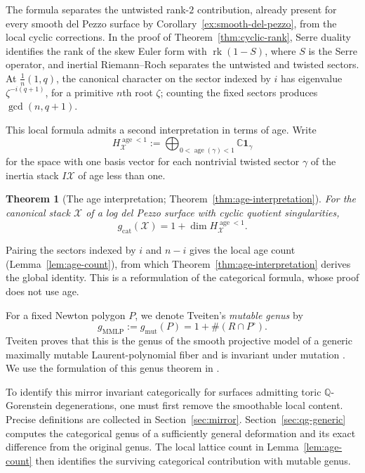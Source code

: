 \documentclass[11pt]{article}
\theoremstyle{plain}
\newtheorem{theorem}{Theorem}[section]
\theoremstyle{definition}
\theoremstyle{remark}
\newcommand{\cX}{\mathcal X}
\newcommand{\rk}{\operatorname{rk}}
\newcommand{\C}{\mathbb C}
\newcommand{\Q}{\mathbb Q}
\newcommand{\1}{\mathbf 1}
\begin{document}
The formula separates the untwisted rank-$2$ contribution, already present for every smooth del Pezzo surface by Corollary~\ref{ex:smooth-del-pezzo}, from the local cyclic corrections.  In the proof of Theorem~\ref{thm:cyclic-rank}, Serre duality identifies the rank of the skew Euler form with $\rk(1-S)$, where $S$ is the Serre operator, and inertial Riemann--Roch separates the untwisted and twisted sectors.  At $\frac1n(1,q)$, the canonical character on the sector indexed by $i$ has eigenvalue $\zeta^{-i(q+1)}$, for a primitive $n$th root $\zeta$; counting the fixed sectors produces $\gcd(n,q+1)$.

This local formula admits a second interpretation in terms of age.  Write
\[
H^{\operatorname{age}<1}_{\cX}
:=\bigoplus_{0<\operatorname{age}(\gamma)<1}\C\1_\gamma
\]
for the space with one basis vector for each nontrivial twisted sector $\gamma$ of the inertia stack $I\cX$ of age less than one.

\begin{theorem}[The age interpretation; Theorem~\ref{thm:age-interpretation}]\label{thm:intro-age}
For the canonical stack $\cX$ of a log del Pezzo surface with cyclic quotient singularities,
\[
g_{\mathrm{cat}}(\cX)=1+\dim H^{\operatorname{age}<1}_{\cX}.
\]
\end{theorem}

Pairing the sectors indexed by $i$ and $n-i$ gives the local age count (Lemma~\ref{lem:age-count}), from which Theorem~\ref{thm:age-interpretation} derives the global identity.  This is a reformulation of the categorical formula, whose proof does not use age.

For a fixed Newton polygon $P$, we denote Tveiten's \emph{mutable genus} by
\[
g_{\mathrm{MMLP}}:=g_{\mathrm{mut}}(P)=1+\#(R\cap P^\circ).
\]
Tveiten proves that this is the genus of the smooth projective model of a generic maximally mutable Laurent-polynomial fiber and is invariant under mutation \cite[Theorem 3.13]{Tveiten}.  We use the formulation of this genus theorem in \cite[Theorem 3.13]{CKPT}.

To identify this mirror invariant categorically for surfaces admitting toric $\Q$-Gorenstein degenerations, one must first remove the smoothable local content.  Precise definitions are collected in Section~\ref{sec:mirror}.  Section~\ref{sec:qg-generic} computes the categorical genus of a sufficiently general deformation and its exact difference from the original genus.  The local lattice count in Lemma~\ref{lem:age-count} then identifies the surviving categorical contribution with mutable genus.
\end{document}
